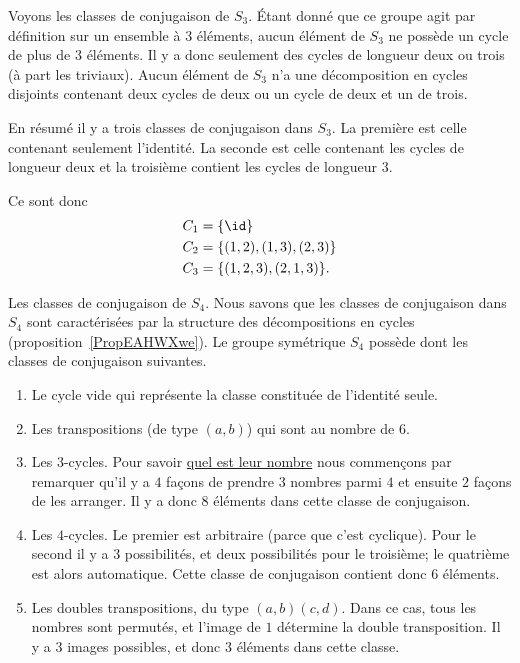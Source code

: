 \begin{example}     \label{EXooQAXRooBsPURs}
    Voyons les classes de conjugaison de \( S_3\). Étant donné que ce groupe agit par définition sur un ensemble à \( 3\) éléments, aucun élément de \( S_3\) ne possède un cycle de plus de \( 3\) éléments. Il y a donc seulement des cycles de longueur deux ou trois (à part les triviaux). Aucun élément de \( S_3\) n'a une décomposition en cycles disjoints contenant deux cycles de deux ou un cycle de deux et un de trois.

    En résumé il y a trois classes de conjugaison dans \( S_3\). La première est celle contenant seulement l'identité. La seconde est celle contenant les cycles de longueur deux et la troisième contient les cycles de longueur \( 3\).

    Ce sont donc
    \begin{subequations}
        \begin{align}
            C_1&=\{ \id \}\\
            C_2&=\{ (1,2),(1,3),(2,3) \}\\
            C_3&=\{ (1,2,3),(2,1,3) \}.
        \end{align}
    \end{subequations}
\end{example}

\begin{example} \label{ExVYZPzub}
    Les classes de conjugaison de \( S_4\). Nous savons que les classes de conjugaison dans \( S_4\) sont caractérisées par la structure des décompositions en cycles (proposition~\ref{PropEAHWXwe}). Le groupe symétrique \( S_4\) possède dont les classes de conjugaison suivantes.
\begin{enumerate}
    \item
        Le cycle vide qui représente la classe constituée de l'identité seule.
    \item
        Les transpositions (de type \( (a,b)\)) qui sont au nombre de \( 6\).
    \item
        Les \( 3\)-cycles. Pour savoir \href{http://www.toujourspret.com/techniques/expression/chants/C/cantique_des_etoiles.php}{quel est leur nombre} nous commençons par remarquer qu'il y a \( 4\) façons de prendre \( 3\) nombres parmi \( 4\) et ensuite \( 2\) façons de les arranger. Il y a donc \( 8\) éléments dans cette classe de conjugaison.
    \item
        Les \( 4\)-cycles. Le premier est arbitraire (parce que c'est cyclique). Pour le second il y a \( 3\) possibilités, et deux possibilités pour le troisième; le quatrième est alors automatique. Cette classe de conjugaison contient donc \( 6\) éléments.
    \item       \label{ITEMooGCMYooKZgFHX}
        Les doubles transpositions, du type \( (a,b)(c,d)\). Dans ce cas, tous les nombres sont permutés, et l'image de $1$ détermine la double transposition. Il y a $3$ images possibles, et donc \( 3\) éléments dans cette classe.
\end{enumerate}
\end{example}


